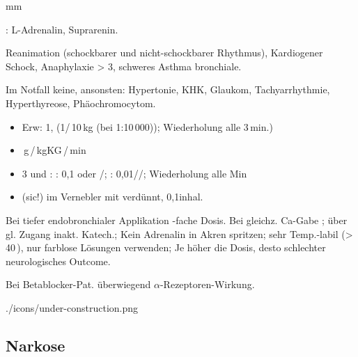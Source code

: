{
\begin{labeling}[:]{mm}
  \item[Präp] : L-Adrenalin,  Suprarenin.
  \item[Ind] Reanimation (schockbarer und nicht-schockbarer Rhythmus),
  Kardiogener Schock, Anaphylaxie > 3{\textdegree},  schweres Asthma bronchiale.
  \item[KI]Im Notfall keine, ansonsten:
  Hypertonie, KHK, Glaukom, Tachyarrhythmie, Hyperthyreose,
  Phäochromocytom.
  \item[\textrecipe]
  \begin{itemize}
    \item {} Erw: 1\Mg, 
    (1\Ml*/\,10\,kg (bei 1:10\,000)); Wiederholung alle 3\,min.)
    \item {}
    \,{\textmu}g\,/\,kgKG\,/\,min
    \item {} 3{\textdegree} und : 
    : 0,1\Mg* {} oder \Mg* {}/; 
    : 0,01\MgKg//; 
    Wiederholung alle  Min
    \item {}  (sic!) im Vernebler  mit 
    verdünnt, 0,1\MgKg* inhal.
  \end{itemize}
  \item[Anm] Bei tiefer endobronchialer Applikation -fache Dosis.
  Bei gleichz. Ca-Gabe ;  über gl. Zugang inakt.
  Katech.; Kein Adrenalin in Akren spritzen; sehr Temp.-labil
  ({\textgreater}\,40\,{\textcelsius}), nur farblose Lösungen verwenden; Je höher die
  Dosis, desto schlechter neurologisches Outcome.
  \item[Cave] Bei Betablocker-Pat. überwiegend
  {$\alpha$}-Rezeptoren-Wirkung.
\end{labeling}
}
{}
{./icons/under-construction.png}
{}
{}

\subsection{Narkose}





